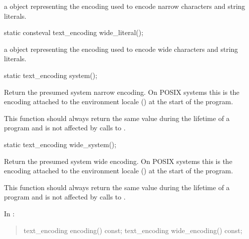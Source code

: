 \documentclass{wg21}
\begin{document}
\begin{addedblock}
\begin{itemdescr}
    \returns a  object representing the encoding used to encode narrow characters and string literals.
\end{itemdescr}

\begin{itemdecl}
static consteval text_encoding wide_literal();
\end{itemdecl}

\begin{itemdescr}
    \returns a  object representing the encoding used to encode wide characters and string literals.
\end{itemdescr}

\begin{itemdecl}
static text_encoding system();
\end{itemdecl}

\begin{itemdescr}
Return the presumed system narrow encoding.
On POSIX systems this is the encoding attached to the environment locale () at the start of the program.

\begin{note}
This function should always return the same value during the lifetime of a program and is not affected by calls to .
\end{note}

\end{itemdescr}

\begin{itemdecl}
static text_encoding wide_system();
\end{itemdecl}

\begin{itemdescr}
Return the presumed system wide encoding.
On POSIX systems this is the encoding attached to the environment locale () at the start of the program.

\begin{note}
This function should always return the same value during the lifetime of a program and is not affected by calls to .
\end{note}
\end{itemdescr}


\end{addedblock}

In \tcode{[locale]}:

\begin{quote}
\begin{codeblock}
namespace std {
  class locale {
  public:
    [...]

    // locale operations
    string name() const;
\end{codeblock}
\begin{addedblock}
\begin{codeblock}
    text_encoding encoding() const;
    text_encoding wide_encoding() const;
\end{codeblock}
\end{addedblock}
\begin{codeblock}
  };
}
\end{codeblock}
\end{quote}
\end{document}
